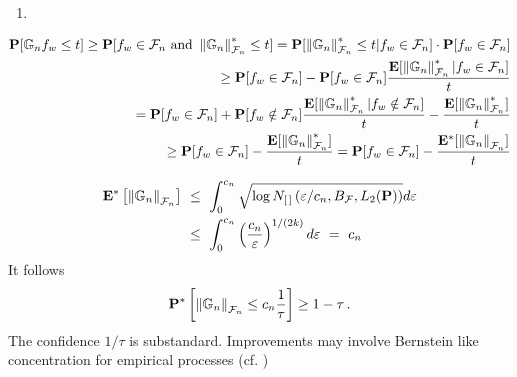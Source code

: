       $
      $
\begin{assumptions*}
  \begin{enumerate}[label={(\roman*)}]
    \item

  \end{enumerate}
\end{assumptions*}


\begin{align}
  \P[
  \mathbb{G}_n f_w \le t
  ]
  \ge
  \P[
  f_w \in \mathcal{F}_n
  \ \text{and}\ 
  \norm{\G_n}_{\mathcal{F}_n}^*
  \le t
  ]
  =
  \P[
  \norm{\G_n}_{\mathcal{F}_n}^*
  \le t
  |
  f_w \in \mathcal{F}_n
  ]
  \cdot
  \P[
  f_w \in \mathcal{F}_n
  ]
  \\
  \ge
  \P[
  f_w \in \mathcal{F}_n
  ]
  -
  \P[
  f_w \in \mathcal{F}_n
  ]
  \frac{
    \E[
  \norm{\G_n}_{\mathcal{F}_n}^*
  |
  f_w \in \mathcal{F}_n
  ]
  }{t}
  \\
  =
  \P[
  f_w \in \mathcal{F}_n
  ]
  +
  \P[
  f_w \notin \mathcal{F}_n
  ]
  \frac{
    \E[
  \norm{\G_n}_{\mathcal{F}_n}^*
  |
  f_w \notin \mathcal{F}_n
  ]
  }{t}
  -
  \frac{
    \E[
  \norm{\G_n}_{\mathcal{F}_n}^*
    ]
  }{t}
  \\
  \ge
  \P[
  f_w \in \mathcal{F}_n
  ]
  -
  \frac{
    \E[
  \norm{\G_n}_{\mathcal{F}_n}^*
    ]
  }{t}
  =
  \P[
  f_w \in \mathcal{F}_n
  ]
  -
  \frac{
    \E^*[
  \norm{\G_n}_{\mathcal{F}_n}
    ]
  }{t}
\end{align}


\begin{align}
  \E^*\left[ 
    \norm{\G_n}_{\mathcal{F}_n}
  \right]
  &
  \ 
  \le
  \ 
  \int_0^{c_n}
  \sqrt{
    \log 
    N_{[\,]}
    \left( 
    \varepsilon / c_n
    ,
    B_{\mathcal{F}}
    ,
    L_2(\P)
    \right)
  }
  d\varepsilon
  \\
  &
  \ 
  \le
  \ 
  \int_0^{c_n}
  \left( 
    \frac{c_n }{\varepsilon}
  \right)^{1/(2k)}
  d \varepsilon
  \ 
  =
  \ 
  c_n
\end{align}
It follows
\begin{gather}
  \mathbf{P}^*\left[ 
    \left\lVert\mathbb{G}_n\right\rVert_{\mathcal{F}_n}
    \le c_n \frac{1}{\tau}
  \right]
  \ge
  1-\tau
   \,.
\end{gather}
The confidence $1/\tau$ is substandard. Improvements may involve Bernstein like concentration for empirical processes (cf. \cite[Section~2.14.2]{vaart2013})

